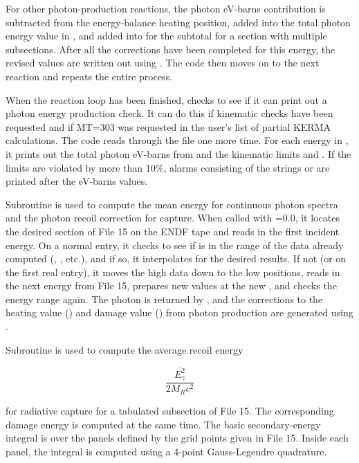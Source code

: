 For other photon-production reactions, the photon eV-barns
contribution is subtracted from the energy-balance heating
position, added into the total photon energy value in
, and added into  for the
subtotal for a section with multiple subsections.  After
all the corrections have been completed for this energy,
the revised values are written out using .  The
code then moves on to the next reaction and repeats the
entire process.

When the reaction loop has been finished, 
checks to see if it can print out a photon energy production
check.  It can do this if kinematic checks have been requested
and if MT=303 was requested in the user's list of partial KERMA
calculations.  The code reads through the 
file one more time.  For each energy in , it
prints out the total photon eV-barns from 
and the kinematic limits  and .  If the
limits are violated by more than 10\%, alarms consisting of the
strings \cword{++++} or \cword{----} are printed after the
eV-barns values.

Subroutine 
is used to compute the mean energy for continuous photon
spectra and the photon recoil correction for capture.
When called with =0.0, it locates the
desired section of File 15 on the ENDF tape and reads in
the first incident energy.  On a normal entry, it checks to
see if  is in the range of the data already computed
(, , etc.), and if so, it interpolates
for the desired results.  If not (or on the first real entry),
it moves the high data down to the low positions, reads in the
next energy from File 15, prepares new values at the new
, and checks the energy range again.  The
photon  is returned by , and the
corrections to the heating value () and damage
value () from photon production are generated
using .

Subroutine 
is used to compute the average recoil energy

\begin{equation}
   \frac{\overline{E_\gamma^2}}{2M_Rc^2}
\end{equation}

\noindent
for radiative capture for a tabulated subsection of File 15.
The corresponding damage energy is computed at the same time.
The basic secondary-energy integral is over the panels
defined by the grid points given in File 15.  Inside each
panel, the integral is computed using a 4-point Gauss-Legendre
quadrature.

